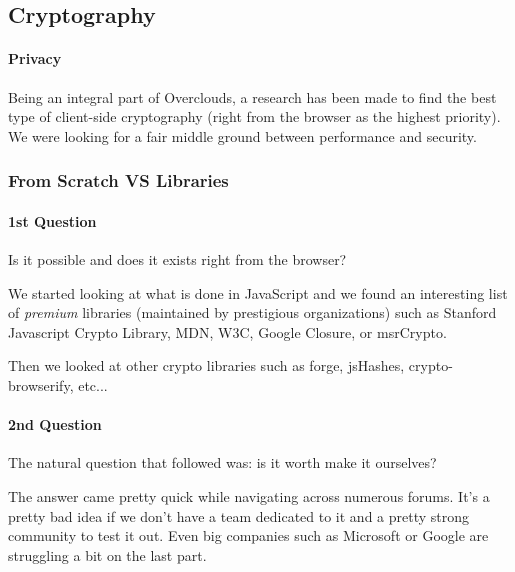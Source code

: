 
\subsection{Cryptography}
\paragraph{Privacy} Being an integral part of Overclouds, a research has been made to find the best type of client-side cryptography (right from the browser as the highest priority). We were looking for a fair middle ground between performance and security.

\subsubsection{From Scratch VS Libraries}
\paragraph{1st Question} Is it possible and does it exists right from the browser?

We started looking at what is done in JavaScript and we found an interesting list of \textit{premium} libraries (maintained by prestigious organizations) such as Stanford Javascript Crypto Library\cite{Stark2009SymmetricJavascript}, MDN\cite{MDN2015MDNCrypto}, W3C\cite{Sleevi2014WebAPI}, Google Closure\cite{Google2015ClosureLibrary}, or msrCrypto\cite{Microsoft2015MSRLibrary}.

Then we looked at other crypto libraries such as forge\cite{DigitalBazaar2016Forge}, jsHashes\cite{Johnston2015JsHashes}, crypto-browserify\cite{Tarr2013Crypto-Browserify}, etc...

\paragraph{2nd Question} The natural question that followed was: is it worth make it ourselves?

The answer came pretty quick while navigating across numerous forums. It's a pretty bad idea if we don't have a team dedicated to it and a pretty strong community to test it out. Even big companies such as Microsoft or Google are struggling a bit on the last part.

